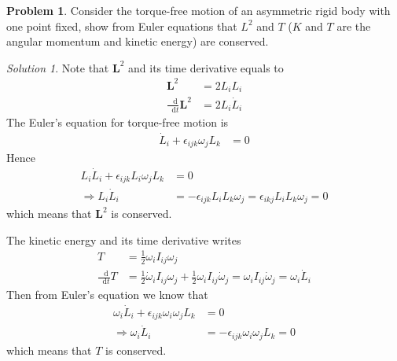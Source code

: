 \documentclass[twoside,11pt]{article}
\newcommand{\lms}{\fontfamily{lmss}\selectfont} %
\renewcommand*\d{\mathop{}\!\mathrm{d}}
\theoremstyle{definition}
\newtheorem{problem}{\lms Problem}
\theoremstyle{remark}
\newtheorem*{solution}{Solution}
\begin{document}
\begin{problem}
Consider the torque-free motion of an asymmetric rigid body with one point fixed,
show from Euler equations that $L^2$ and $T$ ($K$ and $T$ are the angular momentum and
kinetic energy) are conserved.
\end{problem}
\begin{solution}
Note that $\mathbf{L}^2$ and its time derivative equals to
\begin{align*}
    \mathbf{L}^2 &= 2L_iL_i\\
    \frac{\d}{\d t}\mathbf{L}^2 &= 2L_i\dot L_i
\end{align*}
The Euler's equation for torque-free motion is
\begin{align*}
    \dot L_i + \epsilon_{ijk}\omega_jL_k &= 0
\end{align*}
Hence
\begin{align*}
    L_i\dot L_i + \epsilon_{ijk}L_i\omega_j L_k &= 0\\
    \Rightarrow
    L_i\dot L_i &= -\epsilon_{ijk}L_iL_k\omega_j
    = \epsilon_{ikj}L_iL_k\omega_j = 0
\end{align*}
which means that $\mathbf{L}^2$ is conserved.

The kinetic energy and its time derivative writes 
\begin{align*}
    T &= \frac{1}{2}\omega_i I_{ij}\omega_j \\
    \frac{\d}{\d t}T &= \frac{1}{2}\dot\omega_i I_{ij}\omega_j
    + \frac{1}{2}\omega_i I_{ij}\dot\omega_j
    = \omega_i I_{ij}\dot\omega_j 
    = \omega_i\dot L_i
\end{align*}
Then from Euler's equation we know that
\begin{align*}
    \omega_i\dot L_i + \epsilon_{ijk}\omega_i\omega_j L_k &= 0\\
    \Rightarrow \omega_i\dot L_i &= -\epsilon_{ijk}\omega_i\omega_j L_k 
    = 0
\end{align*}
which means that $T$ is conserved.
\end{solution}
\end{document}
